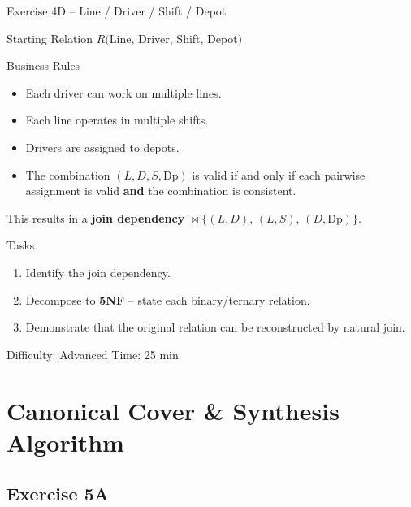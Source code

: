 \documentclass[10pt]{beamer}
\begin{document}
\begin{frame}{Exercise 4D -- Line / Driver / Shift / Depot}
  \begin{block}{Starting Relation}
    $R($Line, Driver, Shift, Depot$)$
  \end{block}

  \begin{block}{Business Rules}
    \begin{itemize}
      \item Each driver can work on multiple lines.
      \item Each line operates in multiple shifts.
      \item Drivers are assigned to depots.
      \item The combination $(L, D, S, \text{Dp})$ is valid if and only if each pairwise assignment is valid \textbf{and} the combination is consistent.
    \end{itemize}
    This results in a \textbf{join dependency} $\bowtie\{(L,D),\,(L,S),\,(D,\text{Dp})\}$.
  \end{block}

  \begin{block}{Tasks}
    \begin{enumerate}
      \item Identify the join dependency.
      \item Decompose to \textbf{5NF} -- state each binary/ternary relation.
      \item Demonstrate that the original relation can be reconstructed by natural join.
    \end{enumerate}
  \end{block}

  \begin{alertblock}{Difficulty: Advanced \quad Time: 25 min}
  \end{alertblock}
\end{frame}

\section{Canonical Cover \& Synthesis Algorithm}

\subsection{Exercise 5A}
\end{document}
